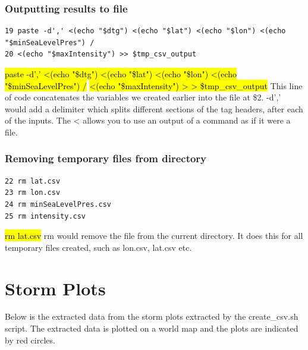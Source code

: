 \documentclass[]{article}
\begin{document}
\subsubsection{Outputting results to file}
\begin{tcolorbox}[colback=white, colframe=black, boxrule=1pt, arc=2mm, 
    title=Outputting results to file, width=6.7in, fonttitle=\bfseries, listing only, listing options={language=sh, basicstyle=\ttfamily}]
\begin{verbatim}
19 paste -d',' <(echo "$dtg") <(echo "$lat") <(echo "$lon") <(echo "$minSeaLevelPres") /
20 <(echo "$maxIntensity") >> $tmp_csv_output
\end{verbatim}
\hl{paste -d',' <(echo "\$dtg") <(echo "\$lat") <(echo "\$lon") <(echo "\$minSeaLevelPres") /}\newline
\hl{<(echo "\$maxIntensity") > > \$tmp\_csv\_output}\newline
This line of code concatenates the variables we created earlier into the file at \$2.\newline
-d',' would add a delimiter which splits different sections of the tag headers, after each of\newline
the inputs. The < allows you to use an output of a command as if it were a file.\newline
\end{tcolorbox}

\subsubsection{Removing temporary files from directory}
\begin{tcolorbox}[colback=white, colframe=black, boxrule=1pt, arc=2mm, 
    title=Removing temporary files from directory, width=6.7in, fonttitle=\bfseries, listing only, listing options={language=sh, basicstyle=\ttfamily}]
\begin{verbatim}
22 rm lat.csv
23 rm lon.csv
24 rm minSeaLevelPres.csv
25 rm intensity.csv
\end{verbatim}
\hl{rm lat.csv}\newline
rm would remove the file from the current directory. It does this for all temporary files created,\newline
such as lon.csv, lat.csv etc.
\end{tcolorbox}
\clearpage



\section{Storm Plots}
Below is the extracted data from the storm plots extracted by the create\_csv.sh
script. The extracted data is plotted on a world map and the plots are indicated by
red circles. 
\end{document}
